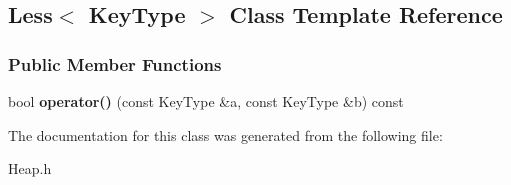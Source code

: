 \hypertarget{class_less}{}\subsection{Less$<$ Key\+Type $>$ Class Template Reference}
\label{class_less}
\subsubsection*{Public Member Functions}
\begin{DoxyCompactItemize}
\item 
bool {\bfseries operator()} (const Key\+Type \&a, const Key\+Type \&b) const \hypertarget{class_less_afee76a5248eb9c6c8fd1f005360d44d5}{}\label{class_less_afee76a5248eb9c6c8fd1f005360d44d5}

\end{DoxyCompactItemize}


The documentation for this class was generated from the following file\+:\begin{DoxyCompactItemize}
\item 
Heap.\+h\end{DoxyCompactItemize}
